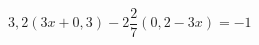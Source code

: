 \begin{ex}[type=equation]
	\begin{condition}
		$3,2(3x + 0,3) - 2\dfrac{2}{7}(0,2 - 3x) = -1$
	\end{condition}
\end{ex}